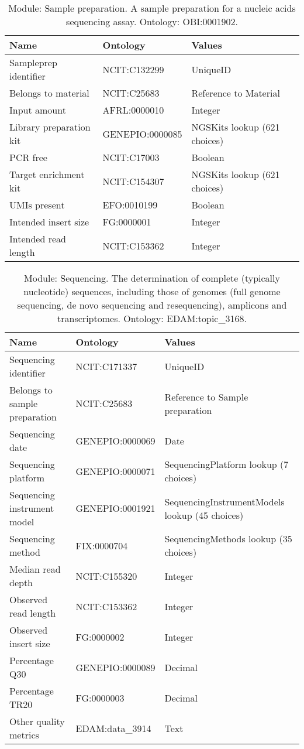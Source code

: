 \documentclass{article}
\begin{document}
\begin{table}[htb]
\begin{tabular}{lll}
Name & Ontology & Values \\
\hline
Sampleprep identifier & NCIT:C132299 & UniqueID \\
Belongs to material & NCIT:C25683 & Reference to Material \\
Input amount & AFRL:0000010 & Integer \\
Library preparation kit & GENEPIO:0000085 & NGSKits lookup (621 choices) \\
PCR free & NCIT:C17003 & Boolean \\
Target enrichment kit & NCIT:C154307 & NGSKits lookup (621 choices) \\
UMIs present & EFO:0010199 & Boolean \\
Intended insert size & FG:0000001 & Integer \\
Intended read length & NCIT:C153362 & Integer \\
\hline
\end{tabular}
\caption[Module: Sample preparation]{\label{table:table9} Module: Sample preparation. A sample preparation for a nucleic acids sequencing assay. Ontology: OBI:0001902. }
\end{table}

\begin{table}[htb]
\begin{tabular}{lll}
Name & Ontology & Values \\
\hline
Sequencing identifier & NCIT:C171337 & UniqueID \\
Belongs to sample preparation & NCIT:C25683 & Reference to Sample preparation \\
Sequencing date & GENEPIO:0000069 & Date \\
Sequencing platform & GENEPIO:0000071 & SequencingPlatform lookup (7 choices) \\
Sequencing instrument model & GENEPIO:0001921 & SequencingInstrumentModels lookup (45 choices) \\
Sequencing method & FIX:0000704 & SequencingMethods lookup (35 choices) \\
Median read depth & NCIT:C155320 & Integer \\
Observed read length & NCIT:C153362 & Integer \\
Observed insert size & FG:0000002 & Integer \\
Percentage Q30 & GENEPIO:0000089 & Decimal \\
Percentage TR20 & FG:0000003 & Decimal \\
Other quality metrics & EDAM:data\_3914 & Text \\
\hline
\end{tabular}
\caption[Module: Sequencing]{\label{table:table10} Module: Sequencing. The determination of complete (typically nucleotide) sequences, including those of genomes (full genome sequencing, de novo sequencing and resequencing), amplicons and transcriptomes. Ontology: EDAM:topic\_3168. }
\end{table}
\end{document}
